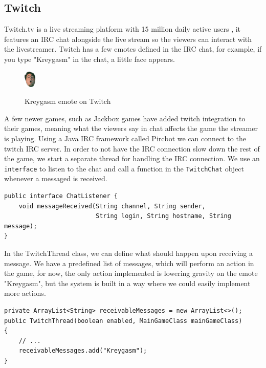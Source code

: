 \documentclass[12p]{article}
\begin{document}

\newpage
\subsection{Twitch} \label{Twitch}

Twitch.tv is a live streaming platform with 15 million daily active users \cite{twitchAbout}, it features an IRC chat alongside the live stream so the viewers can interact with the livestreamer. Twitch has a few emotes defined in the IRC chat, for example, if you type "Kreygasm" in the chat, a little face appears.

\begin{figure}[ht]
  \center
  \includegraphics[width=0.05\textwidth]{Documentation/Kreygasm.png}
  \label{Kreygasm_emote}
  \caption{Kreygasm emote on Twitch \cite{TwitchEmotes}}
\end{figure}

A few newer games, such as Jackbox games \cite{JackboxGames} have added twitch integration to their games, meaning what the viewers say in chat affects the game the streamer is playing. Using a Java IRC framework called Pircbot \cite{pircbot} we can connect to the twitch IRC server. In order to not have the IRC connection slow down the rest of the game, we start a separate thread for handling the IRC connection. We use an \texttt{interface} to listen to the chat and call a function in the \texttt{TwitchChat} object whenever a messaged is received.

\begin{verbatim}
public interface ChatListener {
    void messageReceived(String channel, String sender,
                         String login, String hostname, String message);
}
\end{verbatim}

In the TwitchThread class, we can define what should happen upon receiving a message. We have a predefined list of messages, which will perform an action in the game, for now, the only action implemented is lowering gravity on the emote "Kreygasm", but the system is built in a way where we could easily implement more actions.

\begin{verbatim}
private ArrayList<String> receivableMessages = new ArrayList<>();
public TwitchThread(boolean enabled, MainGameClass mainGameClass)
{
    // ...
    receivableMessages.add("Kreygasm");
}
\end{verbatim}
\end{document}
